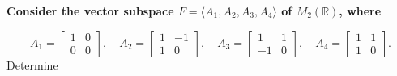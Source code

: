\providecommand{\rank}{\operatorname{r}}
\providecommand{\RR}{\mathbb R}
\providecommand{\CC}{\mathbb C}
\providecommand{\KK}{\mathbb K}

\setcounter{enumi}{84}
\item {\bfseries\boldmath
Consider the vector subspace $F=\langle A_1,A_2,A_3,A_4\rangle$ of $M_2(\RR)$, where
}

\[
A_1=\begin{bmatrix}1&0\\0&0\end{bmatrix},\quad A_2=\begin{bmatrix}1&-1\\1&0\end{bmatrix},\quad A_3=\begin{bmatrix}1&1\\-1&0\end{bmatrix},\quad A_4=\begin{bmatrix}1&1\\1&0\end{bmatrix}.
\]
Determine

